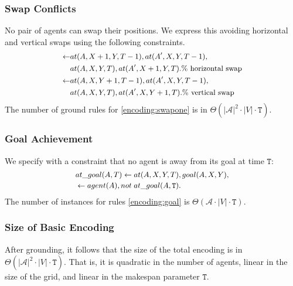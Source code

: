 \subsubsection{Swap Conflicts}
No pair of agents can swap their positions. We express this avoiding horizontal and vertical swaps using the following constraints.
\begin{equation}\small\label{encoding:swapone}
  \begin{split}
        \leftarrow &at(A,X+1,Y,T-1), at(A',X,Y,T-1),\\
        &at(A,X,Y,T), at(A',X+1,Y,T). \text{\% horizontal swap} \\
        \leftarrow &at(A,X,Y+1,T-1), at(A',X,Y,T-1),\\
        &at(A,X,Y,T), at(A',X,Y+1,T). \text{\% vertical swap}
  \end{split}
\end{equation}
The number of ground rules for \eqref{encoding:swapone} is in $\Theta(|\mathcal{A}|^2 \cdot |V| \cdot \mathtt{T})$.

\subsubsection{Goal Achievement}
We specify with a constraint that no agent is away from its goal at time $\mathtt{T}$:
\begin{equation}\small\label{encoding:goal}
  \begin{split}
&at\_goal(A,T) \leftarrow at(A,X,Y,T), goal(A,X,Y),\\
&\leftarrow agent(A), not \; at\_goal(A,\mathtt{T}).
\end{split}
\end{equation}
The number of instances for rules \eqref{encoding:goal} is $\Theta(\mathcal{A} \cdot |V| \cdot \mathtt{T})$.
\subsubsection{Size of Basic Encoding}
After grounding, it follows that the size of the total encoding is in $\Theta(|\mathcal{A}|^2 \cdot |V| \cdot \mathtt{T})$. That is, it is quadratic in the number of agents, linear in the size of the grid, and linear in the makespan parameter $\mathtt{T}$.
